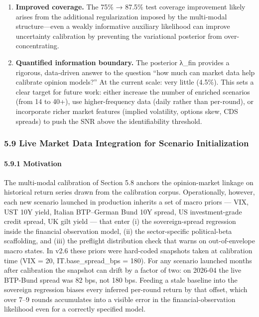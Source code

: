 \documentclass[
]{article}
\begin{document}
\begin{enumerate}
\def\labelenumi{\arabic{enumi}.}
\item
  \textbf{Improved coverage.} The 75\% → 87.5\% test coverage
  improvement likely arises from the additional regularization imposed
  by the multi-modal structure---even a weakly informative auxiliary
  likelihood can improve uncertainty calibration by preventing the
  variational posterior from over-concentrating.
\item
  \textbf{Quantified information boundary.} The posterior λ\_fin
  provides a rigorous, data-driven answer to the question ``how much can
  market data help calibrate opinion models?'' At the current scale:
  very little (4.5\%). This sets a clear target for future work: either
  increase the number of enriched scenarios (from 14 to 40+), use
  higher-frequency data (daily rather than per-round), or incorporate
  richer market features (implied volatility, options skew, CDS spreads)
  to push the SNR above the identifiability threshold.
\end{enumerate}

\subsubsection{5.9 Live Market Data Integration for Scenario
Initialization}\label{live-market-data-integration-for-scenario-initialization}

\paragraph{5.9.1 Motivation}\label{motivation-2}

The multi-modal calibration of Section 5.8 anchors the opinion-market
linkage on historical return series drawn from the calibration corpus.
Operationally, however, each new scenario launched in production
inherits a set of macro priors --- VIX, UST 10Y yield, Italian
BTP--German Bund 10Y spread, US investment-grade credit spread, UK gilt
yield --- that enter (i) the sovereign-spread regression inside the
financial observation model, (ii) the sector-specific political-beta
scaffolding, and (iii) the preflight distribution check that warns on
out-of-envelope macro states. In v2.6 these priors were hard-coded
snapshots taken at calibration time (VIX = 20, IT.base\_spread\_bps =
180). For any scenario launched months after calibration the snapshot
can drift by a factor of two: on 2026-04 the live BTP-Bund spread was 82
bps, not 180 bps. Feeding a stale baseline into the sovereign regression
biases every inferred per-round return by that offset, which over 7--9
rounds accumulates into a visible error in the financial-observation
likelihood even for a correctly specified model.
\end{document}
